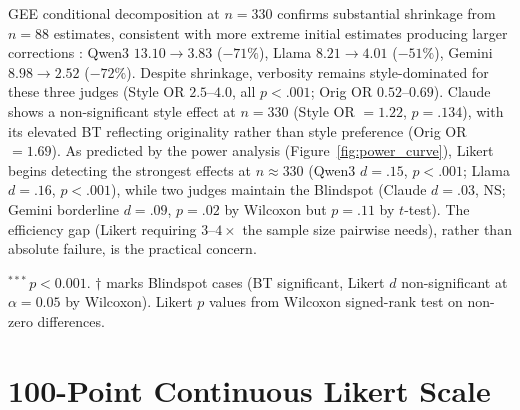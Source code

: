 GEE conditional decomposition at $n = 330$ confirms substantial shrinkage from $n = 88$ estimates, consistent with more extreme initial estimates producing larger corrections \citep{nemes2009bias}: Qwen3 $13.10 \to 3.83$ ($-71\%$), Llama $8.21 \to 4.01$ ($-51\%$), Gemini $8.98 \to 2.52$ ($-72\%$).
Despite shrinkage, verbosity remains style-dominated for these three judges (Style OR $2.5$--$4.0$, all $p < .001$; Orig OR $0.52$--$0.69$).
Claude shows a non-significant style effect at $n = 330$ (Style OR $= 1.22$, $p = .134$), with its elevated BT reflecting originality rather than style preference (Orig OR $= 1.69$).
As predicted by the power analysis (Figure~\ref{fig:power_curve}), Likert begins detecting the strongest effects at $n \approx 330$ (Qwen3 $d = .15$, $p < .001$; Llama $d = .16$, $p < .001$), while two judges maintain the Blindspot (Claude $d = .03$, NS; Gemini borderline $d = .09$, $p = .02$ by Wilcoxon but $p = .11$ by $t$-test).
The efficiency gap (Likert requiring $3$--$4\times$ the sample size pairwise needs), rather than absolute failure, is the practical concern.

\begin{table}[h]
\centering
\small
\caption{Verbosity scaled replication ($n = 330$, four judges; GPT-4o not re-scored). Blindspot partially resolves for strong effects (Qwen3, Llama-70B) but persists for weaker-effect judges (Gemini, Claude).}
\label{tab:verb_n355}
\par\vspace{2pt}
{\footnotesize $^{***}$\,$p < 0.001$. $\dagger$ marks Blindspot cases (BT significant, Likert $d$ non-significant at $\alpha = 0.05$ by Wilcoxon). Likert $p$ values from Wilcoxon signed-rank test on non-zero differences.}
\end{table}

\section{100-Point Continuous Likert Scale}
\label{app:likert100}

